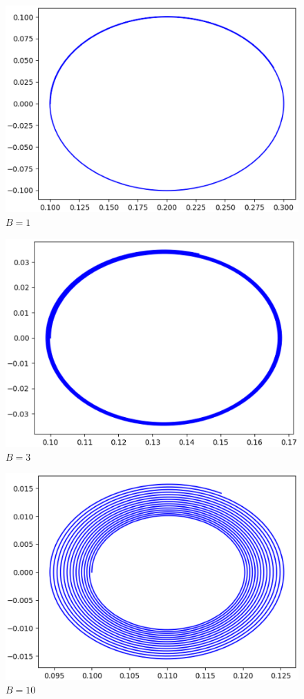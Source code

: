 \documentclass[a4j,titlepage]{jsarticle}
\begin{document}
\begin{figure}[H]
\centering
\includegraphics[scale=0.8]{./img/ka8_b1.eps}
\caption{$B=1$}
\label{8b1}
\end{figure}

\begin{figure}[H]
\centering
\includegraphics[scale=0.8]{./img/ka8_b3.eps}
\caption{$B=3$}
\label{8b3}
\end{figure}

\begin{figure}[H]
\includegraphics[scale=0.8]{./img/ka8_b10.eps}
\centering
\caption{$B=10$}
\label{8b10}
\end{figure}
\end{document}
